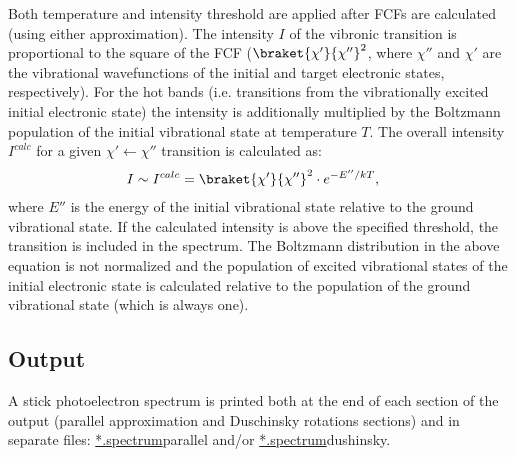 \documentclass[11pt]{article}
\begin{document}
Both temperature and intensity threshold are applied after FCFs are calculated
(using either approximation).
The intensity $I$ of the vibronic transition is proportional to the square of the FCF 
($\braket{\chi '}{\chi''}^2$, where $\chi''$ and $\chi '$ are the 
vibrational wavefunctions of the initial and target electronic states, respectively).
For the hot bands (i.e. transitions from the vibrationally excited initial electronic state) 
the intensity is additionally multiplied by the Boltzmann population of the
initial vibrational state at temperature $T$. 
The overall intensity $I^{calc}$ for a given $\chi ' \leftarrow \chi''$ transition
is calculated as:
\begin{align}
I\sim I^{calc}&=\braket{\chi '}{\chi''}^2\cdot e^{-E''/kT},
\label{eq:intens}
\end{align}
where $E''$ is the energy of the initial vibrational state relative to the ground vibrational state.
If the calculated intensity is above the specified threshold, the transition is included in the spectrum.
The Boltzmann distribution in the above equation is not normalized and the population of excited vibrational
states of the initial electronic state is calculated relative to the population of the ground vibrational
state (which is always one). 



\subsection{Output}
\label{sec:output}

A stick photoelectron spectrum is printed both at the end of each section of the output 
(parallel approximation and Duschinsky rotations sections)
and in separate files: \ul{*.spectrum}{parallel} and/or \ul{*.spectrum}{dushinsky}.
\end{document}
